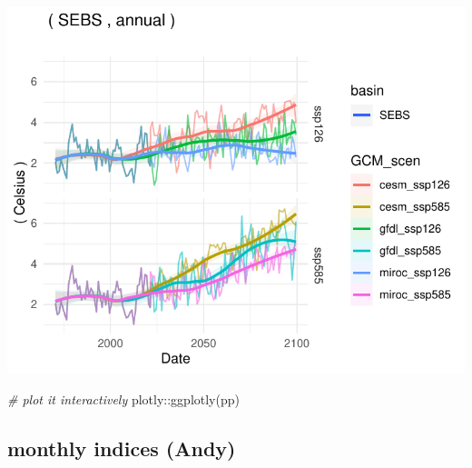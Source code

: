 \documentclass[
]{article}
\newenvironment{Shaded}{\begin{snugshade}}{\end{snugshade}}
\newcommand{\CommentTok}[1]{\textcolor[rgb]{0.56,0.35,0.01}{\textit{#1}}}
\newcommand{\FunctionTok}[1]{\textcolor[rgb]{0.00,0.00,0.00}{#1}}
\newcommand{\NormalTok}[1]{#1}
\newcommand{\SpecialCharTok}[1]{\textcolor[rgb]{0.00,0.00,0.00}{#1}}
\begin{document}
\begin{center}\includegraphics{ACLIM2_quickStart_files/figure-latex/unnamed-chunk-7-1} \end{center}

\begin{Shaded}
\begin{Highlighting}[]
\CommentTok{\# plot it interactively}
\NormalTok{plotly}\SpecialCharTok{::}\FunctionTok{ggplotly}\NormalTok{(pp)}
\end{Highlighting}
\end{Shaded}

\hypertarget{monthly-indices-andy}{%
\subsection{monthly indices (Andy)}\label{monthly-indices-andy}}
\end{document}
